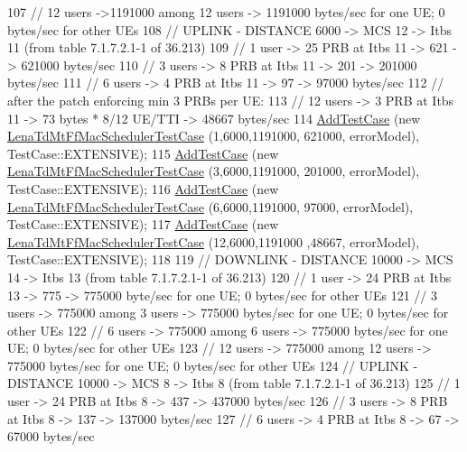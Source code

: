 \begin{DoxyCode}
107   \textcolor{comment}{// 12 users ->1191000 among 12 users -> 1191000 bytes/sec for one UE; 0 bytes/sec for other UEs}
108   \textcolor{comment}{// UPLINK - DISTANCE 6000 -> MCS 12 -> Itbs 11 (from table 7.1.7.2.1-1 of 36.213)}
109   \textcolor{comment}{// 1 user -> 25 PRB at Itbs 11 -> 621 -> 621000 bytes/sec}
110   \textcolor{comment}{// 3 users -> 8 PRB at Itbs 11 -> 201 -> 201000 bytes/sec}
111   \textcolor{comment}{// 6 users -> 4 PRB at Itbs 11 -> 97 -> 97000 bytes/sec}
112   \textcolor{comment}{// after the patch enforcing min 3 PRBs per UE:}
113   \textcolor{comment}{// 12 users -> 3 PRB at Itbs 11 -> 73 bytes * 8/12 UE/TTI -> 48667 bytes/sec}
114   \hyperlink{classns3_1_1TestCase_a3718088e3eefd5d6454569d2e0ddd835}{AddTestCase} (\textcolor{keyword}{new} \hyperlink{classLenaTdMtFfMacSchedulerTestCase}{LenaTdMtFfMacSchedulerTestCase} (1,6000,1191000,
      621000, errorModel), TestCase::EXTENSIVE);
115   \hyperlink{classns3_1_1TestCase_a3718088e3eefd5d6454569d2e0ddd835}{AddTestCase} (\textcolor{keyword}{new} \hyperlink{classLenaTdMtFfMacSchedulerTestCase}{LenaTdMtFfMacSchedulerTestCase} (3,6000,1191000,
      201000, errorModel), TestCase::EXTENSIVE);
116   \hyperlink{classns3_1_1TestCase_a3718088e3eefd5d6454569d2e0ddd835}{AddTestCase} (\textcolor{keyword}{new} \hyperlink{classLenaTdMtFfMacSchedulerTestCase}{LenaTdMtFfMacSchedulerTestCase} (6,6000,1191000,
      97000, errorModel), TestCase::EXTENSIVE);
117   \hyperlink{classns3_1_1TestCase_a3718088e3eefd5d6454569d2e0ddd835}{AddTestCase} (\textcolor{keyword}{new} \hyperlink{classLenaTdMtFfMacSchedulerTestCase}{LenaTdMtFfMacSchedulerTestCase} (12,6000,1191000
      ,48667, errorModel), TestCase::EXTENSIVE);
118 
119   \textcolor{comment}{// DOWNLINK - DISTANCE 10000 -> MCS 14 -> Itbs 13 (from table 7.1.7.2.1-1 of 36.213)}
120   \textcolor{comment}{// 1 user -> 24 PRB at Itbs 13 -> 775 -> 775000 byte/sec for one UE; 0 bytes/sec for other UEs}
121   \textcolor{comment}{// 3 users -> 775000 among 3 users -> 775000 bytes/sec for one UE; 0 bytes/sec for other UEs}
122   \textcolor{comment}{// 6 users -> 775000 among 6 users -> 775000 bytes/sec for one UE; 0 bytes/sec for other UEs}
123   \textcolor{comment}{// 12 users -> 775000 among 12 users -> 775000 bytes/sec for one UE; 0 bytes/sec for other UEs}
124   \textcolor{comment}{// UPLINK - DISTANCE 10000 -> MCS 8 -> Itbs 8 (from table 7.1.7.2.1-1 of 36.213)}
125   \textcolor{comment}{// 1 user -> 24 PRB at Itbs 8 -> 437 -> 437000 bytes/sec}
126   \textcolor{comment}{// 3 users -> 8 PRB at Itbs 8 -> 137 -> 137000 bytes/sec}
127   \textcolor{comment}{// 6 users -> 4 PRB at Itbs 8 -> 67 -> 67000 bytes/sec}

\end{DoxyCode}
